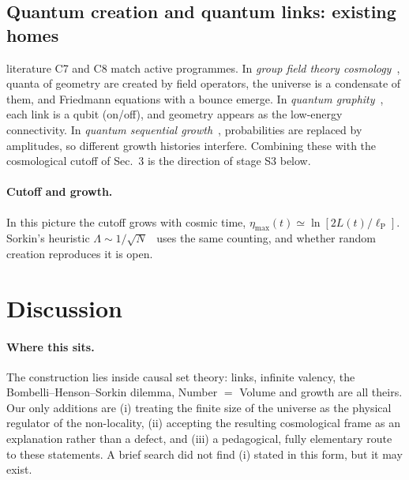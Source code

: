 \documentclass[11pt,a4paper]{article}
\newcommand{\tagbox}[2]{\textsf{\scriptsize\colorbox{#1!12}{\textcolor{#1!70!black}{#2}}}}
\newcommand{\lit}{\tagbox{blue}{literature}}
\newcommand{\lP}{\ell_{\mathrm P}}
\begin{document}
\subsection{Quantum creation and quantum links: existing homes}
\lit{} C7 and C8 match active programmes. In \emph{group field theory cosmology}~\cite{GOS13,OSW16}, quanta of geometry are created by field operators, the universe is a condensate of them, and Friedmann equations with a bounce emerge. In \emph{quantum graphity}~\cite{KMS06}, each link is a qubit (on/off), and geometry appears as the low-energy connectivity. In \emph{quantum sequential growth}~\cite{Gudder12}, probabilities are replaced by amplitudes, so different growth histories interfere. Combining these with the cosmological cutoff of Sec.~3 is the direction of stage S3 below.

\paragraph{Cutoff and growth.} In this picture the cutoff grows with cosmic time, $\eta_{\max}(t)\simeq\ln[2L(t)/\lP]$. Sorkin's heuristic $\Lambda\sim1/\sqrt N$~\cite{ADGS04} uses the same counting, and whether random creation reproduces it is open.

\section{Discussion}
\paragraph{Where this sits.} The construction lies inside causal set theory: links, infinite valency, the Bombelli--Henson--Sorkin dilemma, Number $=$ Volume and growth are all theirs. Our only additions are (i) treating the finite size of the universe as the physical regulator of the non-locality, (ii) accepting the resulting cosmological frame as an explanation rather than a defect, and (iii) a pedagogical, fully elementary route to these statements. A brief search did not find (i) stated in this form, but it may exist.
\end{document}

